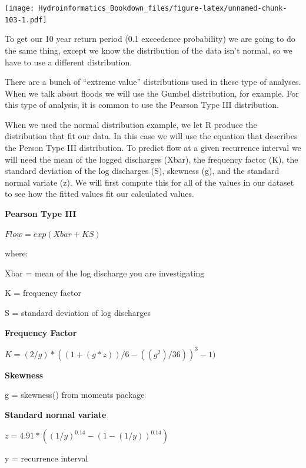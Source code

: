 \documentclass[
]{book}
\begin{document}
\texttt{[image: Hydroinformatics\_Bookdown\_files/figure-latex/unnamed-chunk-103-1.pdf]}

To get our 10 year return period (0.1 exceedence probability) we are going to do the same thing, except we know the distribution of the data isn't normal, so we have to use a different distribution.

There are a bunch of ``extreme value'' distributions used in these type of analyses. When we talk about floods we will use the Gumbel distribution, for example. For this type of analysis, it is common to use the Pearson Type III distribution.

When we used the normal distribution example, we let R produce the distribution that fit our data. In this case we will use the equation that describes the Person Type III distribution. To predict flow at a given recurrence interval we will need the mean of the logged discharges (Xbar), the frequency factor (K), the standard deviation of the log discharges (S), skewness (g), and the standard normal variate (z). We will first compute this for all of the values in our dataset to see how the fitted values fit our calculated values.

\textbf{Pearson Type III}

\(Flow = exp(Xbar + KS)\)

where:

Xbar = mean of the log discharge you are investigating

K = frequency factor

S = standard deviation of log discharges

\textbf{Frequency Factor}

\(K = (2 / g) * ((1 +( g * z)) / 6 - ((g ^ 2) / 36)) ^ 3 - 1)\)

\textbf{Skewness}

g = skewness() from moments package

\textbf{Standard normal variate}

\(z = 4.91 * ((1 / y) ^ {0.14} - (1 - (1 / y)) ^ {0.14})\)

y = recurrence interval
\end{document}
